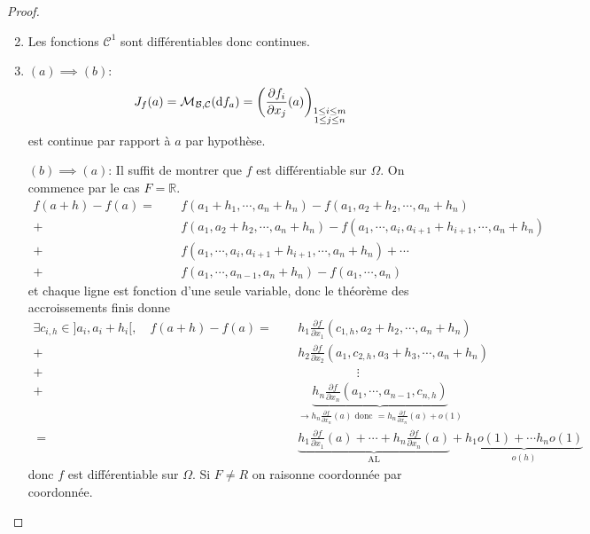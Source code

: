 \begin{proof}~
    \begin{enumerate}
        \setcounter{enumi}{1}
    \item Les fonctions $\mathcal C^1$ sont différentiables donc continues.
    \item $(a) \implies (b)$: \[
            J_f(a)=\mathcal M_{\mathcal B, \mathcal C}(\mathrm{d} f_a)= \left( \frac{\partial f_i}{\partial x_j} (a) \right)_{\substack{1\leq i\leq m\\1\leq j\leq n}}
        \]
        est continue par rapport à $a$ par hypothèse.

        $(b) \implies (a)$: Il suffit de montrer que $f$ est différentiable sur $\Omega$. On commence par le cas $F=\mathbb R$. \begin{align*}
            f(a+h)-f(a) = \phantom{+} & f(a_1+h_1, \cdots, a_n+h_n)-f(a_1, a_2+h_2, \cdots, a_n+h_n) \\
            + & f(a_1, a_2+h_2, \cdots, a_n+h_n)-f(a_1, \cdots, a_i, a_{i+1}+h_{i+1}, \cdots, a_n+h_n) \\
            + & f(a_1, \cdots, a_i, a_{i+1}+h_{i+1}, \cdots, a_n+h_n) + \cdots \\
            + & f(a_1, \cdots, a_{n-1}, a_n+h_n)-f(a_1, \cdots, a_n)
        \end{align*}
        et chaque ligne est fonction d'une seule variable, donc le théorème des accroissements finis donne
        \begin{align*}
            \exists c_{i,h}\in]a_i,a_i+h_i[, \quad f(a+h)-f(a)=\phantom+ &
            h_1\frac{\partial f}{\partial x_1}(c_{1,h}, a_2+h_2, \cdots, a_n+h_n)\\
            + & h_2 \frac{\partial f}{\partial x_2}(a_1, c_{2,h},a_3+h_3,\cdots, a_n+h_n)\\
            + & \hspace{2cm}\vdots \\
            + & \underbrace{h_n \frac{\partial f}{\partial x_n} (a_1, \cdots, a_{n-1}, c_{n,h})}_{\longrightarrow h_n \frac{\partial f}{\partial x_n}(a) \text{ donc } =h_n \frac{\partial f}{\partial x_n}(a)+o(1) } \\
            =\phantom + & \underbrace{h_1 \frac{\partial f}{\partial x_1}(a)+\cdots + h_n \frac{\partial f}{\partial x_n} (a) }_{\text{AL}}  + \underbrace{h_1o(1)+\cdots h_no(1)}_{o(h)}
        \end{align*}
        donc $f$ est différentiable sur $\Omega$. Si $F\neq R$ on raisonne coordonnée par coordonnée.
\end{enumerate}
\end{proof}

